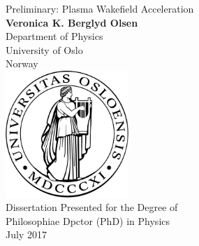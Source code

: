 \begin{titlepage}
    \begin{center}
        \vspace*{10mm}
        \huge{}
        Preliminary: Plasma Wakefield Acceleration\\
        \vspace{20mm}
        \large
        \textbf{Veronica K. Berglyd Olsen}\\
        Department of Physics\\
        University of Oslo\\
        Norway\\
        \vfill
        \includegraphics[width=0.35\textwidth]{Images/UiOLogo.pdf}\\
        \vspace{20mm}
        Dissertation Presented for the Degree of\\
        Philosophiae Dpctor (PhD) in Physics\\
        \vspace{10mm}
        \large{July 2017}
    \end{center}
\end{titlepage}
